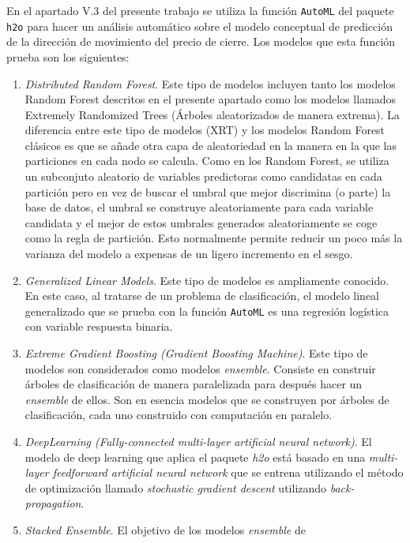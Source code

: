 \documentclass[]{DissertateUSU}
\begin{document}
\noindent En el apartado V.3 del presente trabajo se utiliza la función
\texttt{AutoML} del paquete \texttt{h2o} para hacer un análisis
automático sobre el modelo conceptual de predicción de la dirección de
movimiento del precio de cierre. Los modelos que esta función prueba son
los siguientes:

\begin{enumerate}
\def\labelenumi{\roman{enumi})}
\item
  \emph{Distributed Random Forest}. Este tipo de modelos incluyen tanto
  los modelos Random Forest descritos en el presente apartado como los
  modelos llamados Extremely Randomized Trees (Árboles aleatorizados de
  manera extrema). La diferencia entre este tipo de modelos (XRT) y los
  modelos Random Forest clásicos es que se añade otra capa de
  aleatoriedad en la manera en la que las particiones en cada nodo se
  calcula. Como en los Random Forest, se utiliza un subconjuto aleatorio
  de variables predictoras como candidatas en cada partición pero en vez
  de buscar el umbral que mejor discrimina (o parte) la base de datos,
  el umbral se construye aleatoriamente para cada variable candidata y
  el mejor de estos umbrales generados aleatoriamente se coge como la
  regla de partición. Esto normalmente permite reducir un poco más la
  varianza del modelo a expensas de un ligero incremento en el sesgo.
\item
  \emph{Generalized Linear Models}. Este tipo de modelos es ampliamente
  conocido. En este caso, al tratarse de un problema de clasificación,
  el modelo lineal generalizado que se prueba con la función
  \texttt{AutoML} es una regresión logística con variable respuesta
  binaria.
\item
  \emph{Extreme Gradient Boosting (Gradient Boosting Machine)}. Este
  tipo de modelos son considerados como modelos \emph{ensemble}.
  Consiste en construir árboles de clasificación de manera paralelizada
  para después hacer un \emph{ensemble} de ellos. Son en esencia modelos
  que se construyen por árboles de clasificación, cada uno construido
  con computación en paralelo.
\item
  \emph{DeepLearning (Fully-connected multi-layer artificial neural
  network)}. El modelo de deep learning que aplica el paquete \emph{h2o}
  está basado en una \emph{multi-layer feedforward artificial neural
  network} que se entrena utilizando el método de optimización llamado
  \emph{stochastic gradient descent} utilizando \emph{back-propagation}.
\item
  \emph{Stacked Ensemble}. El objetivo de los modelos \emph{ensemble} de

\end{enumerate}
\end{document}
